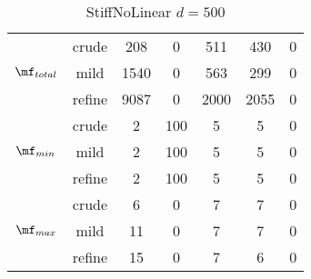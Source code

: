 \begin{table}[htb]
\begin{tabular}{ |c|c|c|c|c|c|c| }
\hline
  & crude & 208 & 0 & 511 & 430 & 0 \\
 $\mf_{total}$  & mild & 1540 & 0 & 563 & 299 & 0 \\
  & refine & 9087 & 0 & 2000 & 2055 & 0 \\
\hline
  & crude & 2 & 100 & 5 & 5 & 0 \\
 $\mf_{min}$  & mild & 2 & 100 & 5 & 5 & 0 \\
  & refine & 2 & 100 & 5 & 5 & 0 \\
\hline
  & crude & 6 & 0 & 7 & 7 & 0 \\
 $\mf_{max}$  & mild & 11 & 0 & 7 & 7 & 0 \\
  & refine & 15 & 0 & 7 & 6 & 0 \\
\hline
\end{tabular}
\caption{ StiffNoLinear $d=500$ }
\end{table}
